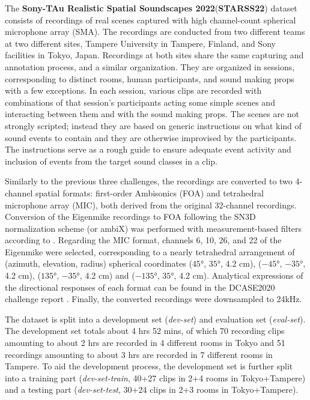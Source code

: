 \documentclass{article}
\begin{document}
\begin{sloppy}
The \textbf{Sony-TAu Realistic Spatial Soundscapes 2022}(\textbf{STARSS22}) dataset consists of recordings of real scenes captured with high channel-count spherical microphone array (SMA). The recordings are conducted from two different teams at two different sites, Tampere University in Tampere, Finland, and Sony facilities in Tokyo, Japan. Recordings at both sites share the same capturing and annotation process, and a similar organization. They are organized in sessions, corresponding to distinct rooms, human participants, and sound making props with a few exceptions. In each session, various clips are recorded with combinations of that session's participants acting some simple scenes and interacting between them and with the sound making props. The scenes are not strongly scripted; instead they are based on generic instructions on what kind of sound events to contain and they are otherwise improvised by the participants. The instructions serve as a rough guide to ensure adequate event activity and inclusion of events from the target sound classes in a clip. 

Similarly to the previous three challenges, the recordings are converted to two 4-channel spatial formats: first-order Ambisonics (FOA) and tetrahedral microphone array (MIC), both derived from the original 32-channel recordings. Conversion of the Eigenmike recordings to FOA following the SN3D normalization scheme (or ambiX) was performed with measurement-based filters according to \cite{politis2017comparing}. Regarding the MIC format, channels 6, 10, 26, and 22 of the Eigenmike were selected, corresponding to a nearly tetrahedral arrangement of (azimuth, elevation, radius) spherical coordinates ($\ang{45}$, $\ang{35}$, 4.2 cm), ($\ang{-45}$, $\ang{-35}$, 4.2 cm), ($\ang{135}$, $\ang{-35}$, 4.2 cm) and ($\ang{-135}$, $\ang{35}$, 4.2 cm). Analytical expressions of the directional responses of each format can be found in the DCASE2020 challenge report \cite{Politis2020}. Finally, the converted recordings were downsampled to 24kHz.

The dataset is split into a development set (\emph{dev-set}) and evaluation set (\emph{eval-set}). The development set totals about 4 hrs 52 mins, of which 70 recording clips amounting to about 2 hrs are recorded in 4 different rooms in Tokyo and 51 recordings amounting to about 3 hrs are recorded in 7 different rooms in Tampere. To aid the development process, the development set is further split into a training part (\emph{dev-set-train}, 40+27 clips in 2+4 rooms in Tokyo+Tampere) and a testing part (\emph{dev-set-test}, 30+24 clips in 2+3 rooms in Tokyo+Tampere).






\end{sloppy}
\end{document}
